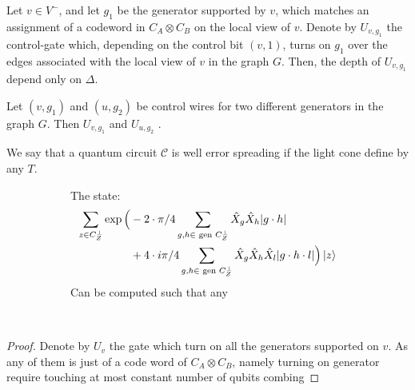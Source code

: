 \documentclass[manuscript,screen,review]{acmart}
\begin{document}
\begin{claim} 
  Let $v \in V^{-}$, and let $g_{1}$ be the generator supported by $v$, which matches an assignment of a codeword in $C_{A}\otimes C_{B}$ on the local view of $v$. Denote by $U_{v, g_{1}}$ the control-gate which, depending on the control bit $(v,1)$, turns on $g_{1}$ over the edges associated with the local view of $v$ in the graph $G$. Then, the depth of $U_{v,g_{1}}$ depend only on $\Delta$.   
\end{claim}

\begin{claim}
  Let $(v,g_{1})$ and $(u,g_{2})$ be control wires for two different generators in the graph $G$. Then $U_{v,g_{1}}$ and $U_{u,g_{2}}$ . 
\end{claim}

\begin{definition}
  We say that a quantum circuit $\mathcal{C}$ is well error spreading if the light cone define by any $T$. 
\end{definition}

\begin{figure}[h]
  \begin{subfigure}[b]{0.45\textwidth}
\begin{claim}
  The state:
  \begin{equation*}
    \begin{split}
      \sum_{z \in C_{Z}^{\perp}}  \exp \Big(  & -  2 \cdot \pi/4 \sum_{g ,h \in \text{ gen } C_{Z}^{\perp}} \hat{X}_{g}\hat{X}_{h}|g\cdot h| \\
 & +  4 \cdot i\pi/4 \sum_{g,h \in \text{ gen } C_{Z}^{\perp}} \hat{X}_{g}\hat{X}_{h}\hat{X}_{l}|g\cdot h \cdot l|  \Big) \ket{z}
    \end{split}
  \end{equation*}
  Can be computed such that any 
\end{claim}  \end{subfigure}
  \begin{subfigure}[b]{0.05\textwidth}
    \
  \end{subfigure}
  \begin{subfigure}[b]{0.45\textwidth} 
  \end{subfigure} 
\end{figure}



\begin{proof}
  Denote by $U_{v}$ the gate which turn on all the generators supported on $v$. As any of them is just of a code word of $C_{A}\otimes C_{B}$, namely turning on generator require touching at most constant number of qubits combing  
\end{proof}
\end{document}
